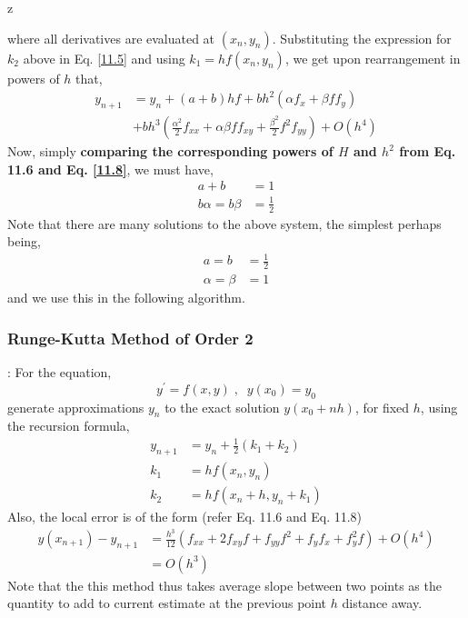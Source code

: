 z\documentclass[a4paper,12pt,twoside]{book}
\newcommand{\algo}[0]{\boxed{\textbf{\textit{Algorithm}}}}
\renewcommand{\d}[0]{\prime}
\begin{document}
where all derivatives are evaluated at $(x_n,y_n)$. Substituting the expression for $k_2$ above in Eq. \ref{11.5}
 and using $k_1 = hf(x_n,y_n)$, we get upon rearrangement in powers of $h$ that,
 \begin{equation}
 \label{11.8}
     \begin{split}
         y_{n+1} &= y_n + (a+b)hf + bh^2(\alpha f_x + \beta ff_y)\\
         &+bh^3\left( \frac{\alpha^2}{2}f_{xx} + \alpha \beta ff_{xy} + \frac{\beta^2}{2}f^2 f_{yy} \right) + O(h^4)
     \end{split}
 \end{equation}
 Now, simply \textbf{comparing the corresponding powers of $H$ and $h^2$ from Eq. 11.6 and Eq. \ref{11.8}}, we must have,
 \begin{equation*}
     \begin{split}
         a+b &= 1\\
         b\alpha = b\beta &= \frac{1}{2}
     \end{split}
 \end{equation*}
 Note that there are many solutions to the above system, the simplest perhaps being,
\begin{equation*}
    \begin{split}
        a=b&=\frac{1}{2}\\
        \alpha = \beta &= 1
    \end{split}
\end{equation*}
and we use this in the following algorithm.
\subsubsection{Runge-Kutta Method of Order 2}
\algo : For the equation,
\[y^\d = f(x,y) \;,\;\; y(x_0) = y_0\]
generate approximations $y_n$ to the exact solution $y(x_0 + nh)$, for fixed $h$, using the recursion formula,
\begin{equation}
    \begin{split}
        y_{n+1} &= y_n + \frac{1}{2}(k_1+k_2)\\
        k_1&= hf(x_n,y_n)\\
        k_2 &= hf(x_n + h,y_n + k_1)
    \end{split}
\end{equation}
Also, the local error is of the form (refer Eq. 11.6 and Eq. 11.8)
\begin{equation}
\begin{split}
    y(x_{n+1}) - y_{n+1} &= \frac{h^3}{12} (f_{xx} + 2f_{xy}f + f_{yy}f^2 + f_yf_x + f_y^2f) + O(h^4)\\
    &= O(h^3)
    \end{split}
\end{equation}
Note that the this method thus takes average slope between two points as the quantity to add to current estimate at the previous point $h$ distance away.
\end{document}
